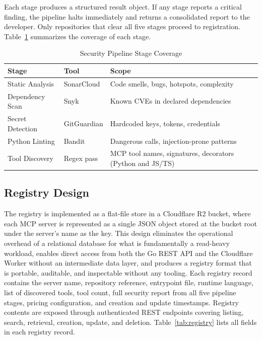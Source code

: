 \documentclass[conference]{IEEEtran}
\begin{document}
Each stage produces a structured result object.
If any stage reports a critical finding, the pipeline halts immediately
and returns a consolidated report to the developer.
Only repositories that clear all five stages proceed to registration.
Table~\ref{tab:pipeline} summarizes the coverage of each stage.

\begin{table}[htbp]
  \caption{Security Pipeline Stage Coverage}
  \label{tab:pipeline}
  \centering
  \begin{tabular}{llp{3.8cm}}
    \toprule
    \textbf{Stage} & \textbf{Tool} & \textbf{Scope} \\
    \midrule
    Static Analysis  & SonarCloud  & Code smells, bugs, hotspots, complexity \\
    Dependency Scan  & Snyk        & Known CVEs in declared dependencies \\
    Secret Detection & GitGuardian & Hardcoded keys, tokens, credentials \\
    Python Linting   & Bandit      & Dangerous calls, injection-prone patterns \\
    Tool Discovery   & Regex pass  & MCP tool names, signatures, decorators (Python and JS/TS) \\
    \bottomrule
  \end{tabular}
\end{table}

\subsection{Registry Design}

The registry is implemented as a flat-file store in a Cloudflare R2
bucket, where each MCP server is represented as a single JSON object
stored at the bucket root under the server's name as the key.
This design eliminates the operational overhead of a relational database
for what is fundamentally a read-heavy workload, enables direct access
from both the Go REST API and the Cloudflare Worker without an
intermediate data layer, and produces a registry format that is
portable, auditable, and inspectable without any tooling.
Each registry record contains the server name, repository reference,
entrypoint file, runtime language, list of discovered tools, tool count,
full security report from all five pipeline stages, pricing
configuration, and creation and update timestamps.
Registry contents are exposed through authenticated REST endpoints
covering listing, search, retrieval, creation, update, and deletion.
Table~\ref{tab:registry} lists all fields in each registry record.
\end{document}
